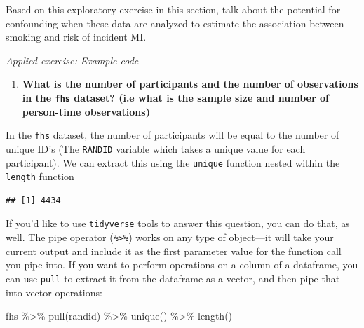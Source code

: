 \documentclass[
]{book}
\newenvironment{Shaded}{\begin{snugshade}}{\end{snugshade}}
\newcommand{\FunctionTok}[1]{\textcolor[rgb]{0.00,0.00,0.00}{#1}}
\newcommand{\NormalTok}[1]{#1}
\newcommand{\SpecialCharTok}[1]{\textcolor[rgb]{0.00,0.00,0.00}{#1}}
\providecommand{\tightlist}{%
  \setlength{\itemsep}{0pt}\setlength{\parskip}{0pt}}
\begin{document}
Based on this exploratory exercise in this section, talk about the potential
for confounding when these data are analyzed to estimate the association between
smoking and risk of incident MI.

\emph{Applied exercise: Example code}

\begin{enumerate}
\def\labelenumi{\arabic{enumi}.}
\tightlist
\item
  \textbf{What is the number of participants and the number of observations in the \texttt{fhs} dataset? (i.e what is the sample size and number of person-time observations)}
\end{enumerate}

In the \texttt{fhs} dataset, the number of participants will be equal to the number of unique ID's (The \texttt{RANDID} variable which takes a unique value for each participant). We can extract this using the \texttt{unique} function nested within the \texttt{length} function

\begin{Shaded}
\end{Shaded}

\begin{verbatim}
## [1] 4434
\end{verbatim}

If you'd like to use \texttt{tidyverse} tools to answer this question, you can do
that, as well. The pipe operator (\texttt{\%\textgreater{}\%}) works on any type of object---it will
take your current output and include it as the first parameter value for the
function call you pipe into. If you want to perform operations on a column of
a dataframe, you can use \texttt{pull} to extract it from the dataframe as a vector, and
then pipe that into vector operations:

\begin{Shaded}
\begin{Highlighting}[]
\NormalTok{fhs }\SpecialCharTok{\%\textgreater{}\%} 
  \FunctionTok{pull}\NormalTok{(randid) }\SpecialCharTok{\%\textgreater{}\%} 
  \FunctionTok{unique}\NormalTok{() }\SpecialCharTok{\%\textgreater{}\%} 
  \FunctionTok{length}\NormalTok{()}
\end{Highlighting}
\end{Shaded}
\end{document}
